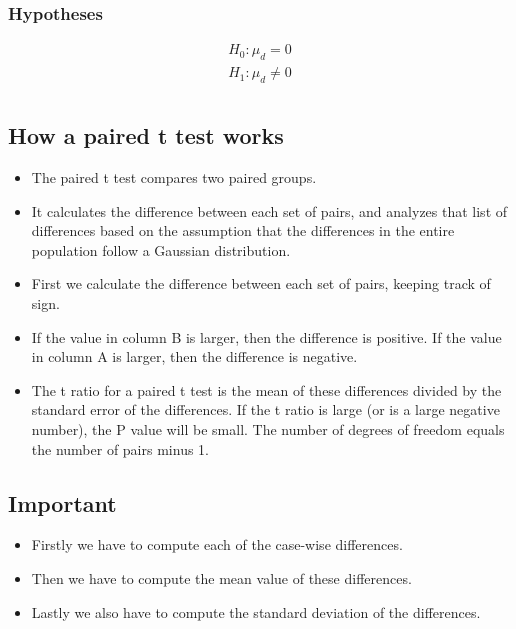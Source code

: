 \documentclass[]{report}
\begin{document}
\subsubsection{Hypotheses}
\begin{eqnarray*}
H_{0}: \mu_{d} = 0\\
H_{1}: \mu_{d} \neq 0\\
\end{eqnarray*}











\subsection{How a paired t test works}
\begin{itemize}
\item The paired t test compares two paired groups.
\item It calculates the difference between each set of pairs, and analyzes that list of differences based on the assumption that the differences in the entire population follow a Gaussian distribution.
\item First we calculate the difference between each set of pairs, keeping track of sign.
\item If the value in column B is larger, then the difference is positive.
If the value in column A is larger, then the difference is negative.
\item The t ratio for a paired t test is the mean of these differences divided by the standard error of the differences. If the t ratio is large (or is a large negative number), the P value will be small. The number of degrees of freedom equals the number of pairs minus 1.
\end{itemize}

\begin{framed}
\section{Important}
\begin{itemize}
\item Firstly we have to compute each of the case-wise differences.
\item Then we have to compute the mean value of these differences.
\item Lastly we also have to compute the standard deviation of the differences.
\end{itemize}
\end{framed}
\end{document}
